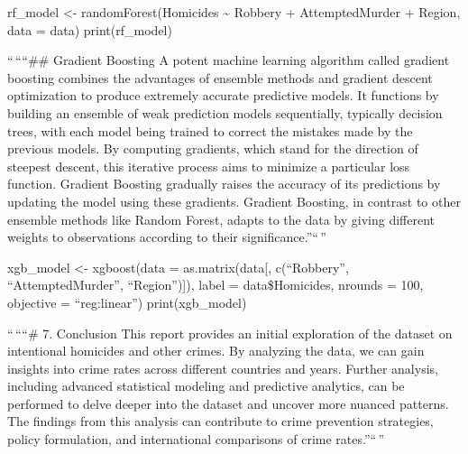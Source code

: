 \documentclass[
]{article}
\begin{document}
rf\_model \textless- randomForest(Homicides \textasciitilde{} Robbery +
AttemptedMurder + Region, data = data) print(rf\_model)

``\,````\#\# Gradient Boosting A potent machine learning algorithm
called gradient boosting combines the advantages of ensemble methods and
gradient descent optimization to produce extremely accurate predictive
models. It functions by building an ensemble of weak prediction models
sequentially, typically decision trees, with each model being trained to
correct the mistakes made by the previous models. By computing
gradients, which stand for the direction of steepest descent, this
iterative process aims to minimize a particular loss function. Gradient
Boosting gradually raises the accuracy of its predictions by updating
the model using these gradients. Gradient Boosting, in contrast to other
ensemble methods like Random Forest, adapts to the data by giving
different weights to observations according to their
significance.''``\,''

xgb\_model \textless- xgboost(data = as.matrix(data{[}, c(``Robbery'',
``AttemptedMurder'', ``Region''){]}), label = data\$Homicides, nrounds =
100, objective = ``reg:linear'') print(xgb\_model)

``\,````\# 7. Conclusion This report provides an initial exploration of
the dataset on intentional homicides and other crimes. By analyzing the
data, we can gain insights into crime rates across different countries
and years. Further analysis, including advanced statistical modeling and
predictive analytics, can be performed to delve deeper into the dataset
and uncover more nuanced patterns. The findings from this analysis can
contribute to crime prevention strategies, policy formulation, and
international comparisons of crime rates.''``\,''
\end{document}
